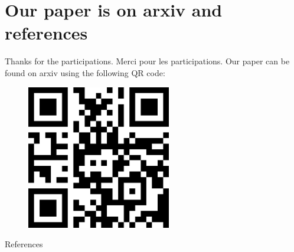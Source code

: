 \documentclass[11pt]{beamer}
\theoremstyle{definition}
\begin{document}
\section{Our paper is on arxiv and references}
    \begin{frame}{Thanks for the participations. Merci pour les participations.}
        Our paper can be found on arxiv using the following QR code: 
        \begin{figure}
            \centering
            \includegraphics[width=17em]{assets/paper-qrcode.png}
        \end{figure}
    \end{frame}
    \begin{frame}{References}        
        
    \end{frame}
\end{document}
